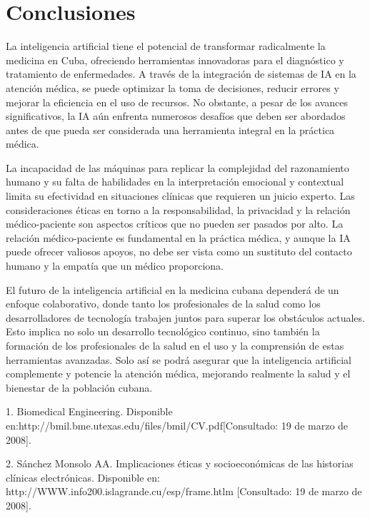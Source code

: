 \documentclass[a4paper,10pt]{article}
\begin{document}
\section{Conclusiones}

La inteligencia artificial tiene el potencial de transformar radicalmente la medicina en Cuba, ofreciendo herramientas innovadoras para el diagnóstico y tratamiento de enfermedades. A través de la integración de sistemas de IA en la atención médica, se puede optimizar la toma de decisiones, reducir errores y mejorar la eficiencia en el uso de recursos. No obstante, a pesar de los avances significativos, la IA aún enfrenta numerosos desafíos que deben ser abordados antes de que pueda ser considerada una herramienta integral en la práctica médica.\vspace{1cm}

La incapacidad de las máquinas para replicar la complejidad del razonamiento humano y su falta de habilidades en la interpretación emocional y contextual limita su efectividad en situaciones clínicas que requieren un juicio experto. Las consideraciones éticas en torno a la responsabilidad, la privacidad y la relación médico-paciente son aspectos críticos que no pueden ser pasados por alto. La relación médico-paciente es fundamental en la práctica médica, y aunque la IA puede ofrecer valiosos apoyos, no debe ser vista como un sustituto del contacto humano y la empatía que un médico proporciona.\vspace{1cm}

El futuro de la inteligencia artificial en la medicina cubana dependerá de un enfoque colaborativo, donde tanto los profesionales de la salud como los desarrolladores de tecnología trabajen juntos para superar los obstáculos actuales. Esto implica no solo un desarrollo tecnológico continuo, sino también la formación de los profesionales de la salud en el uso y la comprensión de estas herramientas avanzadas. Solo así se podrá asegurar que la inteligencia artificial complemente y potencie la atención médica, mejorando realmente la salud y el bienestar de la población cubana.

% 



1. Biomedical Engineering. Disponible en:http://bmil.bme.utexas.edu/files/bmil/CV.pdf[Consultado: 19 de marzo de 2008]. 

2. Sánchez Monsolo AA. Implicaciones éticas y socioeconómicas de las historias clínicas electrónicas. Disponible en: http://WWW.info200.islagrande.cu/esp/frame.htlm [Consultado: 19 de marzo de 2008]. 
\end{document}
